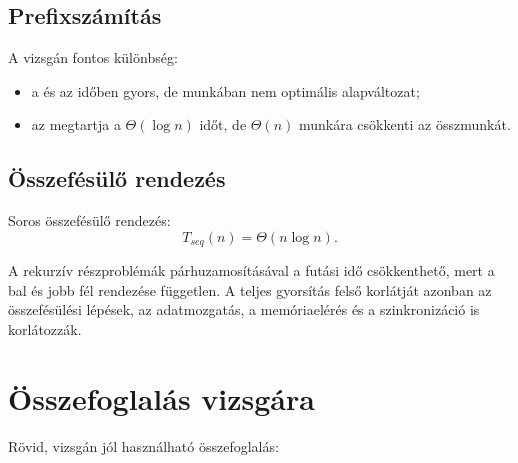 \subsection{Prefixszámítás}

\begin{center}

\end{center}

A vizsgán fontos különbség:

\begin{itemize}
  \item a  és az  időben gyors, de munkában nem optimális alapváltozat;
  \item az  megtartja a $\Theta(\log n)$ időt, de $\Theta(n)$ munkára csökkenti az összmunkát.
\end{itemize}

\subsection{Összefésülő rendezés}

Soros összefésülő rendezés:
\[
  T_{seq}(n)=\Theta(n\log n).
\]

A rekurzív részproblémák párhuzamosításával a futási idő csökkenthető, mert a bal és jobb fél rendezése független. A teljes gyorsítás felső korlátját azonban az összefésülési lépések, az adatmozgatás, a memóriaelérés és a szinkronizáció is korlátozzák.

\section{Összefoglalás vizsgára}

Rövid, vizsgán jól használható összefoglalás:

